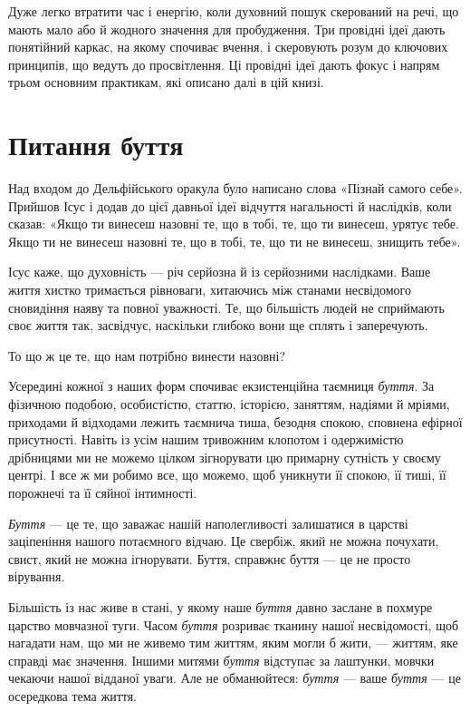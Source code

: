 Дуже легко втратити час і енергію, коли духовний пошук скерований на речі, що мають мало або й жодного значення для пробудження. Три провідні ідеї дають понятійний каркас, на якому спочиває вчення, і скеровують розум до ключових принципів, що ведуть до просвітлення. Ці провідні ідеї дають фокус і напрям трьом основним практикам, які описано далі в цій книзі.

\section*{Питання буття}

Над входом до Дельфійського оракула було написано слова «Пізнай самого себе». Прийшов Ісус і додав до цієї давньої ідеї відчуття нагальності й наслідків, коли сказав: «Якщо ти винесеш назовні те, що в тобі, те, що ти винесеш, урятує тебе. Якщо ти не винесеш назовні те, що в тобі, те, що ти не винесеш, знищить тебе».

Ісус каже, що духовність — річ серйозна й із серйозними наслідками. Ваше життя хистко тримається рівноваги, хитаючись між станами несвідомого сновидіння наяву та повної уважності. Те, що більшість людей не сприймають своє життя так, засвідчує, наскільки глибоко вони ще сплять і заперечують.

То що ж це те, що нам потрібно винести назовні?

Усередині кожної з наших форм спочиває екзистенційна таємниця \emph{буття}. За фізичною подобою, особистістю, статтю, історією, заняттям, надіями й мріями, приходами й відходами лежить таємнича тиша, безодня спокою, сповнена ефірної присутності. Навіть із усім нашим тривожним клопотом і одержимістю дрібницями ми не можемо цілком зігнорувати цю примарну сутність у своєму центрі. І все ж ми робимо все, що можемо, щоб уникнути її спокою, її тиші, її порожнечі та її сяйної інтимності.

\emph{Буття} — це те, що заважає нашій наполегливості залишатися в царстві заціпеніння нашого потаємного відчаю. Це свербіж, який не можна почухати, свист, який не можна ігнорувати. Буття, справжнє буття — це не просто вірування.

Більшість із нас живе в стані, у якому наше \emph{буття} давно заслане в похмуре царство мовчазної туги. Часом \emph{буття} розриває тканину нашої несвідомості, щоб нагадати нам, що ми не живемо тим життям, яким могли б жити, — життям, яке справді має значення. Іншими митями \emph{буття} відступає за лаштунки, мовчки чекаючи нашої відданої уваги. Але не обманюйтеся: \emph{буття} — ваше \emph{буття} — це осередкова тема життя.

